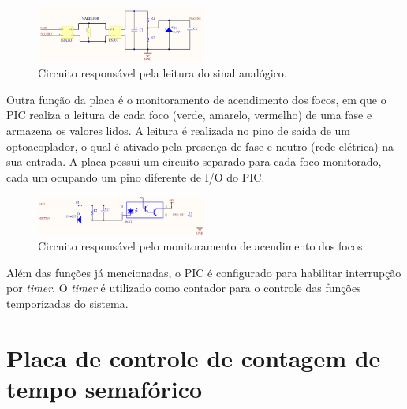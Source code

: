 \begin{figure}[ht]
    \begin{center}
    \includegraphics[width=0.5\textwidth]{figuras/trafo.PNG}
    \end{center}
    \caption[Detecção da lâmpada]{Circuito responsável pela leitura do sinal analógico.}
    \label{trafo}
\end{figure}

Outra função da placa é o monitoramento de acendimento dos focos, em que o PIC realiza a leitura de cada foco (verde, amarelo, vermelho) de uma fase e armazena os valores lidos. A leitura é realizada no pino de saída de um optoacoplador, o qual é ativado pela presença de fase e neutro (rede elétrica) na sua entrada. A placa possui um circuito separado para cada foco monitorado, cada um ocupando um pino diferente de \ac{I/O} do PIC.

\begin{figure}[ht]
    \begin{center}
    \includegraphics[width=0.5\textwidth]{figuras/4n33.PNG}
    \end{center}
    \caption[Detecção de presença de fase]{Circuito responsável pelo monitoramento de acendimento dos focos.}
    \label{4n33}
\end{figure}

Além das funções já mencionadas, o PIC é configurado para habilitar interrupção por \textit{timer}. O \textit{timer} é utilizado como contador para o controle das funções temporizadas do sistema. 

\section{Placa de controle de contagem de tempo semafórico}

